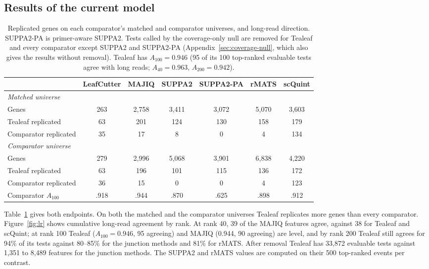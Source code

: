 \documentclass[11pt]{article}
\begin{document}
\subsection{Results of the current model}

\begin{table}[ht]
\centering
\small
\setlength{\tabcolsep}{4pt}
\begin{tabular}{lcccccc}
\toprule
 & LeafCutter & MAJIQ & SUPPA2 & SUPPA2-PA & rMATS & scQuint\\
\midrule
\multicolumn{7}{l}{\emph{Matched universe}}\\
Genes & 263 & 2{,}758 & 3{,}411 & 3{,}072 & 5{,}070 & 3{,}603\\
Tealeaf replicated & 63 & 201 & 124 & 130 & 158 & 179\\
Comparator replicated & 35 & 17 & 8 & 0 & 4 & 134\\
\midrule
\multicolumn{7}{l}{\emph{Comparator universe}}\\
Genes & 279 & 2{,}996 & 5{,}068 & 3{,}901 & 6{,}838 & 4{,}220\\
Tealeaf replicated & 63 & 196 & 101 & 115 & 136 & 172\\
Comparator replicated & 36 & 15 & 0 & 0 & 4 & 123\\
\midrule
Comparator $A_{100}$ & .918 & .944 & .870 & .625 & .898 & .912\\
\bottomrule
\end{tabular}
\caption{Replicated genes on each comparator's matched and comparator universes, and long-read direction. SUPPA2-PA is primer-aware SUPPA2. Tests called by the coverage-only null are removed for Tealeaf and every comparator except SUPPA2 and SUPPA2-PA (Appendix~\ref{sec:coverage-null}, which also gives the results without removal). Tealeaf has $A_{100}=0.946$ (95 of its 100 top-ranked evaluable tests agree with long reads; $A_{40}=0.963$, $A_{200}=0.942$).}
\label{tab:results}
\end{table}

Table~\ref{tab:results} gives both endpoints. On both the matched and the comparator universes Tealeaf replicates more genes than every comparator. Figure~\ref{fig:lr} shows cumulative long-read agreement by rank. At rank 40, 39 of the MAJIQ features agree, against 38 for Tealeaf and scQuint; at rank 100 Tealeaf ($A_{100}=0.946$, 95 agreeing) and MAJIQ (0.944, 90 agreeing) are level, and by rank 200 Tealeaf still agrees for 94\% of its tests against 80--85\% for the junction methods and 81\% for rMATS. After removal Tealeaf has 33{,}872 evaluable tests against 1{,}351 to 8{,}489 features for the junction methods. The SUPPA2 and rMATS values are computed on their 500 top-ranked events per contrast.
\end{document}
